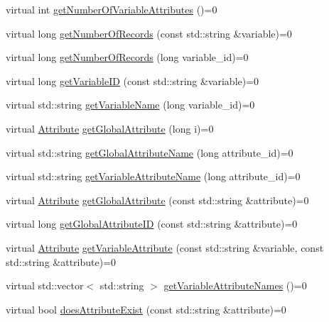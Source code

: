 \begin{DoxyCompactItemize}
\item 
virtual int \hyperlink{classccmc_1_1_file_reader_ad5c3584515c7f2896b49af21b2b15890}{get\-Number\-Of\-Variable\-Attributes} ()=0
\item 
virtual long \hyperlink{classccmc_1_1_file_reader_a6bed5da48bfcdf635a2f6cc71a1d5ca3}{get\-Number\-Of\-Records} (const std\-::string \&variable)=0
\item 
virtual long \hyperlink{classccmc_1_1_file_reader_a34a7240022397c1ee0efb71751ded69c}{get\-Number\-Of\-Records} (long variable\-\_\-id)=0
\item 
virtual long \hyperlink{classccmc_1_1_file_reader_a937185c6d323262f7c3f3c4d39b59e37}{get\-Variable\-I\-D} (const std\-::string \&variable)=0
\item 
virtual std\-::string \hyperlink{classccmc_1_1_file_reader_af688dd7824a25f91404e5f586d1ebe86}{get\-Variable\-Name} (long variable\-\_\-id)=0
\item 
virtual \hyperlink{classccmc_1_1_attribute}{Attribute} \hyperlink{classccmc_1_1_file_reader_a11885da1a8d6775a7d2764494474d067}{get\-Global\-Attribute} (long i)=0
\item 
virtual std\-::string \hyperlink{classccmc_1_1_file_reader_a7a4fc5909fce20cb6a40d0a1af56e9a1}{get\-Global\-Attribute\-Name} (long attribute\-\_\-id)=0
\item 
virtual std\-::string \hyperlink{classccmc_1_1_file_reader_ab901c44fdd1d8f7d4fac85f0747750ee}{get\-Variable\-Attribute\-Name} (long attribute\-\_\-id)=0
\item 
virtual \hyperlink{classccmc_1_1_attribute}{Attribute} \hyperlink{classccmc_1_1_file_reader_ac8c307cb70a6a99892e2538761867998}{get\-Global\-Attribute} (const std\-::string \&attribute)=0
\item 
virtual long \hyperlink{classccmc_1_1_file_reader_a4106475980a5537be0fa0658b6071345}{get\-Global\-Attribute\-I\-D} (const std\-::string \&attribute)=0
\item 
virtual \hyperlink{classccmc_1_1_attribute}{Attribute} \hyperlink{classccmc_1_1_file_reader_ada8128e0f00555a8911be5e95ec18b6e}{get\-Variable\-Attribute} (const std\-::string \&variable, const std\-::string \&attribute)=0
\item 
virtual std\-::vector$<$ std\-::string $>$ \hyperlink{classccmc_1_1_file_reader_a6f11a946eac2b10674e948a3c3785966}{get\-Variable\-Attribute\-Names} ()=0
\item 
virtual bool \hyperlink{classccmc_1_1_file_reader_ac27cfdd9ceabe3af0f14b18fbebcafa5}{does\-Attribute\-Exist} (const std\-::string \&attribute)=0

\end{DoxyCompactItemize}
